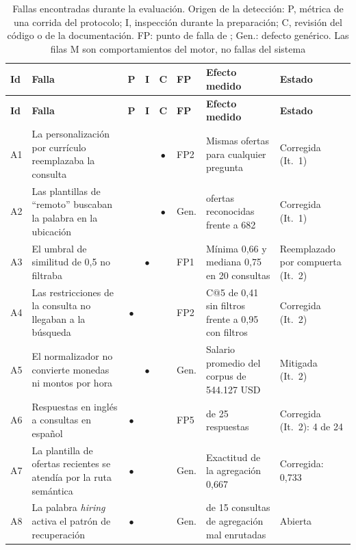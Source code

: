 {\small
\begin{longtable}{|p{0.5cm}|>{\raggedright\arraybackslash}p{4.0cm}|c|c|c|p{0.75cm}|>{\raggedright\arraybackslash}p{3.4cm}|>{\raggedright\arraybackslash}p{2.5cm}|}
    \caption{Fallas encontradas durante la evaluación. Origen de la detección: P, métrica de una corrida del protocolo; I, inspección durante la preparación; C, revisión del código o de la documentación. FP: punto de falla de \citet{Barnett2024}; Gen.: defecto genérico. Las filas M son comportamientos del motor, no fallas del sistema}
    \label{tab:res-fallas} \\
    \hline
    \textbf{Id} & \textbf{Falla} & \textbf{P} & \textbf{I} & \textbf{C} & \textbf{FP} & \textbf{Efecto medido} & \textbf{Estado} \\
    \hline
    \endfirsthead
    \hline
    \textbf{Id} & \textbf{Falla} & \textbf{P} & \textbf{I} & \textbf{C} & \textbf{FP} & \textbf{Efecto medido} & \textbf{Estado} \\
    \hline
    \endhead
    A1 & La personalización por currículo reemplazaba la consulta &  &  & $\bullet$ & FP2 & Mismas ofertas para cualquier pregunta & Corregida (It.~1) \\
    \hline
    A2 & Las plantillas de \enquote{remoto} buscaban la palabra en la ubicación &  &  & $\bullet$ & Gen. & 44 ofertas reconocidas frente a 682 & Corregida (It.~1) \\
    \hline
    A3 & El umbral de similitud de 0,5 no filtraba &  & $\bullet$ &  & FP1 & Mínima 0,66 y mediana 0,75 en 20 consultas & Reemplazado por compuerta (It.~2) \\
    \hline
    A4 & Las restricciones de la consulta no llegaban a la búsqueda & $\bullet$ &  &  & FP2 & C@5 de 0,41 sin filtros frente a 0,95 con filtros & Corregida (It.~2) \\
    \hline
    A5 & El normalizador no convierte monedas ni montos por hora &  & $\bullet$ &  & Gen. & Salario promedio del corpus de 544.127 USD & Mitigada (It.~2) \\
    \hline
    A6 & Respuestas en inglés a consultas en español & $\bullet$ &  &  & FP5 & 21 de 25 respuestas & Corregida (It.~2): 4 de 24 \\
    \hline
    A7 & La plantilla de ofertas recientes se atendía por la ruta semántica & $\bullet$ &  &  & Gen. & Exactitud de la agregación 0,667 & Corregida: 0,733 \\
    \hline
    A8 & La palabra \textit{hiring} activa el patrón de recuperación & $\bullet$ &  &  & Gen. & 2 de 15 consultas de agregación mal enrutadas & Abierta \\

\end{longtable}}
